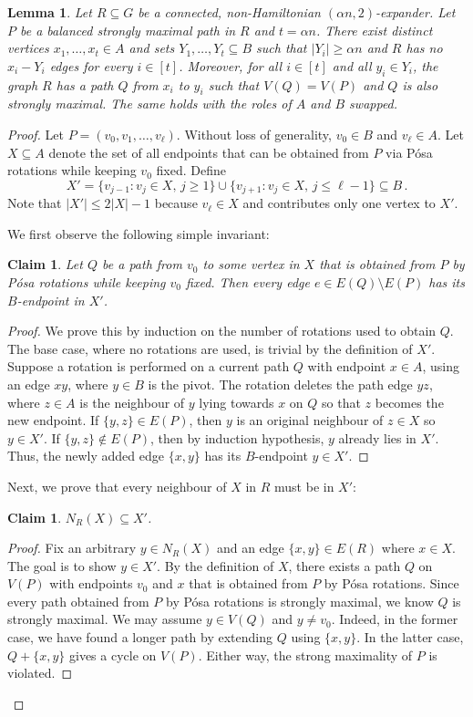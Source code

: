 \documentclass[reqno,final,a4paper]{amsart}
\numberwithin{equation}{section}
\newtheorem{lemma}[theorem]{Lemma}
\newtheorem{claim}[theorem]{Claim}
\theoremstyle{definition}
\theoremstyle{remark}
\begin{document}
\begin{lemma}\label{lem:bipartite-posa-rotation}
    Let $R\subseteq G$ be a connected, non-Hamiltonian $(\alpha n,2)$-expander. Let $P$ be a balanced strongly maximal path in $R$ and $t = \alpha n$. There exist distinct vertices $x_1,\dots, x_t\in A$ and sets $Y_1,\dots, Y_t\subseteq B$ such that $|Y_i|\geq \alpha n$ and $R$ has no $x_i -Y_i$ edges for every $i\in [t]$. Moreover, for all $i\in [t]$ and all $y_i\in Y_i$, the graph $R$ has a path $Q$ from $x_i$ to $y_i$ such that $V(Q) = V(P)$ and $Q$ is also strongly maximal.  
    The same holds with the roles of $A$ and $B$ swapped.
\end{lemma}
\begin{proof}
    Let $P = (v_0,v_1,\dots, v_\ell)$. Without loss of generality, $v_0\in B$ and $v_\ell \in A$.
    Let $X\subseteq A$ denote the set of all endpoints that can be obtained from $P$ via P\'osa rotations while keeping $v_0$ fixed.
    Define 
    $$X' = \{v_{j-1}: v_j\in X, \,j\geq 1\}\cup \{v_{j+1}: v_j\in X, \,j\leq \ell-1\} \subseteq B\,.$$
    Note that $|X'|\leq 2|X|-1$ because $v_\ell\in X$ and contributes only one vertex to $X'$. 

    We first observe the following simple invariant:
    \begin{claim}\label{cla:invariant}
        Let $Q$ be a path from $v_0$ to some vertex in $X$ that is obtained from $P$ by P\'osa rotations while keeping $v_0$ fixed. 
        Then every edge $e\in E(Q)\setminus E(P)$ has its $B$-endpoint in $X'$.
    \end{claim}
    \begin{proof}
          We prove this by induction on the number of rotations used to obtain $Q$. The base case, where no rotations are used, is trivial by the definition of $X'$. 
        Suppose a rotation is performed on a current path $Q$ with endpoint $x\in A$, using an edge $xy$, where $y\in B$ is the pivot. The rotation deletes the path edge $yz$, where $z\in A$ is the neighbour of $y$ lying towards $x$ on $Q$ so that $z$ becomes the new endpoint. If $\{y,z\}\in E(P)$, then $y$ is an original neighbour of $z\in X$ so $y\in X'$. If $\{y,z\}\notin E(P)$, then by induction hypothesis, $y$ already lies in $X'$. Thus, the newly added edge $\{x,y\}$ has its $B$-endpoint $y\in X'$.
    \end{proof}
    Next, we prove that every neighbour of $X$ in $R$ must be in $X'$:
    \begin{claim}
        $N_R(X)\subseteq X'$.
    \end{claim}
    \begin{proof}
        Fix an arbitrary $y\in N_R(X)$ and an edge $\{x,y\}\in E(R)$ where $x\in X$.
        The goal is to show $y\in X'$. By the definition of $X$, there exists a path $Q$ on $V(P)$ with endpoints $v_0$ and $x$ that is obtained from $P$ by P\'osa rotations. 
        Since every path obtained from $P$ by P\'osa rotations is strongly maximal, we know $Q$ is strongly maximal.
        We may assume $y\in V(Q)$ and $y\neq v_0$. Indeed, in the former case, we have found a longer path by extending $Q$ using $\{x,y\}$. In the latter case, $Q+\{x,y\}$ gives a cycle on $V(P)$. Either way, the strong maximality of $P$ is violated.
         

\end{proof}
\end{proof}
\end{document}
